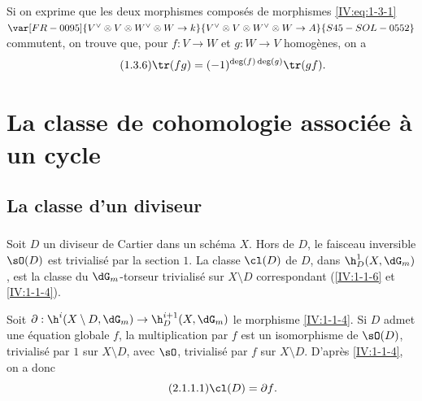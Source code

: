 Si on exprime que les deux morphismes composés de morphismes 
\eqref{IV:eq:1-3-1} $\var[FR-0095]{V^\vee\otimes V\otimes W^\vee\otimes W\to k}{V^\vee\otimes V\otimes W^\vee\otimes W\to A}{S45-SOL-0552}$ commutent, on 
trouve que, pour $f:V\to W$ et $g:W\to V$ homogènes, on a 
\begin{equation*}\tag{1.3.6}\label{IV:eq:1-3-6}
  \tr(f g) = (-1)^{\deg(f)\deg(g)} \tr(g f) \text{.}
\end{equation*}




















\section{La classe de cohomologie associée à un cycle}\label{IV:2}










\subsection{La classe d'un diviseur}\label{IV:2-1}





\subsubsection{}\label{IV:2-1-1}

Soit $D$ un diviseur de Cartier dans un schéma $X$. Hors de $D$, le faisceau 
inversible $\sO(D)$ est trivialisé par la section $1$. La classe 
$\cl(D)$ de $D$, dans $\h_D^1(X,\dG_m)$, est la classe du 
$\dG_m$-torseur trivialisé sur $X\setminus D$ correspondant 
(\ref{IV:1-1-6} et \ref{IV:1-1-4}). 

Soit $\partial:\h^i(X\setminus D,\dG_m)\to \h_D^{i+1}(X,\dG_m)$ le morphisme 
\ref{IV:1-1-4}. Si $D$ admet une équation globale $f$, la multiplication par 
$f$ est un isomorphisme de $\sO(D)$, trivialisé par $1$ sur $X\setminus D$, 
avec $\sO$, trivialisé par $f$ sur $X\setminus D$. D'après \ref{IV:1-1-4}, 
on a donc 
\begin{equation*}\tag{2.1.1.1}\label{IV:eq:2-1-1}
  \cl(D) = \partial f \text{.}
\end{equation*}


